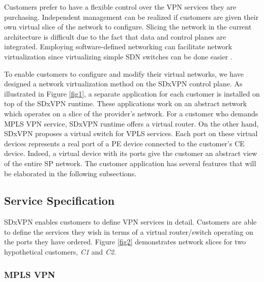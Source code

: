 \documentclass[10pt,conference]{IEEEtran}
\begin{document}
Customers prefer to have a flexible control over the VPN services they are purchasing. Independent management can be realized if customers are given their own virtual slice of the network to configure. Slicing the network in the current architecture is difficult due to the fact that data and control planes are integrated. Employing software-defined networking can facilitate network virtualization since virtualizing simple SDN switches can be done easier \cite{17}.

To enable customers to configure and modify their virtual networks, we have  designed a network virtualization method on the SDxVPN control plane. As illustrated in Figure \ref {fig1},  a separate application for each customer is installed on top of the SDxVPN runtime. These applications work on an abstract network which operates on a slice of the provider's network. For a customer who demands MPLS VPN service, SDxVPN runtime offers a virtual router. On the other hand, SDxVPN proposes a virtual switch for VPLS services. Each port on these virtual devices represents a real port of a PE device connected to the customer's CE device. Indeed, a virtual device with its ports give the customer an abstract view of the entire SP network.
The customer application has several features that will be elaborated in the following subsections.
\subsection{Service Specification}\label{sec2a}
SDxVPN enables customers to define VPN services in detail. Customers are able to define the services they wish in terms of a virtual router/switch operating on the ports they have ordered. Figure \ref {fig2} demonstrates network slices for two hypothetical customers, \textit{C1} and \textit{C2}. 
 

\subsubsection {\textbf{ MPLS VPN}}
\end{document}
